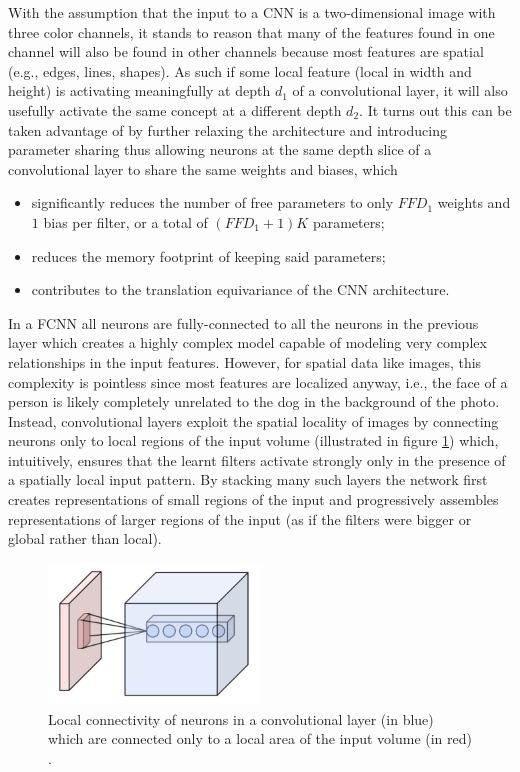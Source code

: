 With the assumption that the input to a \ac{CNN} is a two-dimensional image with three color channels, it stands to reason that many of the features found in one channel will also be found in other channels because most features are spatial (e.g., edges, lines, shapes). As such if some local feature (local in width and height) is activating meaningfully at depth $d_1$ of a convolutional layer, it will also usefully activate the same concept at a different depth $d_2$. It turns out this can be taken advantage of by further relaxing the architecture and introducing parameter sharing thus allowing neurons at the same depth slice of a convolutional layer to share the same weights and biases, which

\begin{itemize}
    \item significantly reduces the number of free parameters to only $F F D_1$ weights and $1$ bias per filter, or a total of $(F F D_1 + 1) K$ parameters;
    \item reduces the memory footprint of keeping said parameters;
    \item contributes to the translation equivariance of the \ac{CNN} architecture.
\end{itemize}

In a \ac{FCNN} all neurons are fully-connected to all the neurons in the previous layer which creates a highly complex model capable of modeling very complex relationships in the input features. However, for spatial data like images, this complexity is pointless since most features are localized anyway, i.e., the face of a person is likely completely unrelated to the dog in the background of the photo. Instead, convolutional layers exploit the spatial locality of images by connecting neurons only to local regions of the input volume (illustrated in figure \ref{fig:localconnectivity}) which, intuitively, ensures that the learnt filters activate strongly only in the presence of a spatially local input pattern. By stacking many such layers the network first creates representations of small regions of the input and progressively assembles representations of larger regions of the input (as if the filters were bigger or global rather than local).

\begin{figure}[ht]
    \centering
    \includegraphics[width=0.5\textwidth]{figs/localconnectivity.png}
    \caption{Local connectivity of neurons in a convolutional layer (in blue) which are connected only to a local area of the input volume (in red) \cite{cs231n}.}
    \label{fig:localconnectivity}
\end{figure}

